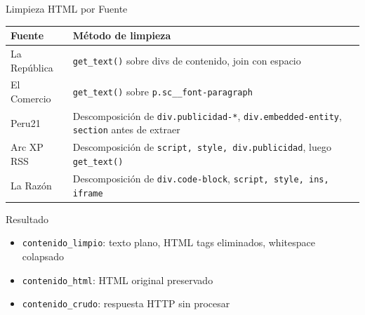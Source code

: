 \documentclass[11pt,aspectratio=169,spanish]{beamer}
\begin{document}
\begin{frame}{Limpieza HTML por Fuente}
    \begin{table}[h]
    \small
    \begin{tabular}{lp{8cm}}
        \toprule
        \textbf{Fuente} & \textbf{Método de limpieza} \\
        \midrule
        La República & \texttt{get\_text()} sobre divs de contenido, join con espacio \\
        El Comercio  & \texttt{get\_text()} sobre \texttt{p.sc\_\_font-paragraph} \\
        Peru21       & Descomposición de \texttt{div.publicidad-*}, \texttt{div.embedded-entity}, \texttt{section} antes de extraer \\
        Arc XP RSS   & Descomposición de \texttt{script, style, div.publicidad}, luego \texttt{get\_text()} \\
        La Razón     & Descomposición de \texttt{div.code-block}, \texttt{script, style, ins, iframe} \\
        \bottomrule
    \end{tabular}
    \end{table}

    \begin{block}{Resultado}
        \begin{itemize}
            \item \texttt{contenido\_limpio}: texto plano, HTML tags eliminados, whitespace colapsado
            \item \texttt{contenido\_html}: HTML original preservado
            \item \texttt{contenido\_crudo}: respuesta HTTP sin procesar
        \end{itemize}
    \end{block}
\end{frame}
\end{document}
